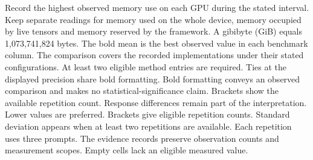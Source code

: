 \documentclass[conference,onecolumn]{IEEEtran}
\begin{document}
\begin{table}[!htp]
\begin{minipage}{\linewidth}
Record the highest observed memory use on each GPU during the stated interval. Keep separate readings for memory used on the whole device, memory occupied by live tensors and memory reserved by the framework. A gibibyte (GiB) equals 1,073,741,824 bytes.
The bold mean is the best observed value in each benchmark column. The comparison covers the recorded implementations under their stated configurations. At least two eligible method entries are required. Ties at the displayed precision share bold formatting. Bold formatting conveys an observed comparison and makes no statistical-significance claim. Brackets show the available repetition count. Response differences remain part of the interpretation. Lower values are preferred.
Brackets give eligible repetition counts. Standard deviation appears when at least two repetitions are available. Each repetition uses three prompts. The evidence records preserve observation counts and measurement scopes. Empty cells lack an eligible measured value.
\end{minipage}
\end{table}
\end{document}
